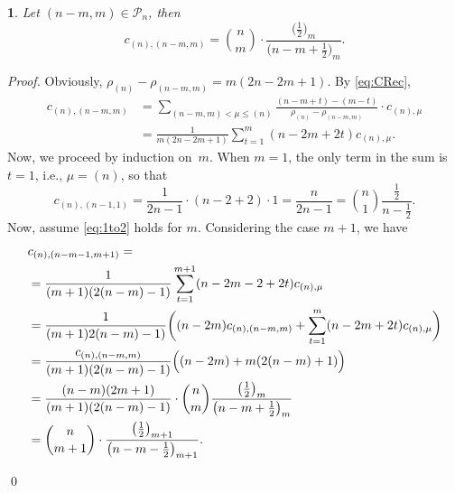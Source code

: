 \documentclass[smallextended]{svjour3}
\newtheorem{thm}{\protect\theoremname}
\providecommand{\theoremname}{Theorem}
\begin{document}
\begin{thm}\label{thm:row1}
Let $(n-m,m)\in\mathcal{P}_n$, then
\begin{equation}\label{eq:1to2}
  c_{(n),(n-m,m)} =
  \binom{n}{m}\cdot\frac{\bigl(\frac12\bigr)_m}{\bigl(n-m+\frac12\bigr)_m}.
\end{equation}
\end{thm}
\begin{proof}
Obviously, 
$ \rho_{(n)}-\rho_{(n-m,m)}=m(2n-2m+1)$. By \eqref{eq:CRec},
\begin{align*}
  c_{(n),(n-m,m)}
  &= \sum_{(n-m,m)<\mu\leq(n)}\frac{(n-m+t)-(m-t)}
    {\rho_{(n)}-\rho_{(n-m,m)}}\cdot c_{(n),\mu} \\
  &= \frac{1}{m(2n-2m+1)}\sum_{t=1}^{m}(n-2m+2t)c_{(n),\mu}.
\end{align*}
Now, we proceed by induction on~$m$. When $m=1$, the only term in the sum is $t=1$, i.e., $\mu=(n)$,  so that
\begin{equation}\label{eq:cnton1}
  c_{(n),(n-1,1)}=\frac{1}{2n-1}\cdot(n-2+2)\cdot1=\frac{n}{2n-1}=\binom{n}{1}\frac{\frac{1}{2}}{n-\frac{1}{2}}.
\end{equation}
Now, assume \eqref{eq:1to2} holds for $m$. Considering the case $m+1$, we have
\begin{align*}
  & c_{(n),(n-m-1,m+1)} = \\
  &= \frac{1}{(m+1)(2(n-m)-1)}\sum_{t=1}^{m+1}(n-2m-2+2t)c_{(n),\mu} \\
  &= \frac{1}{(m+1)2(n-m)-1)}\biggl((n-2m)c_{(n),(n-m,m)}+\sum_{t=1}^{m}(n-2m+2t)c_{(n),\mu}\biggr) \\
  &= \frac{c_{(n),(n-m,m)}}{(m+1)(2(n-m)-1)}\Bigl((n-2m)+m(2(n-m)+1)\Bigr) \\
  &= \frac{(n-m)(2m+1)}{(m+1)(2(n-m)-1)}\cdot\binom{n}{m}\frac{\bigl(\frac12\bigr)_m}{\bigl(n-m+\frac12\bigr)_m} \\
  &= \binom{n}{m+1}\cdot\frac{\bigl(\frac12\bigr)_{m+1}}{\bigl(n-m-\frac12\bigr)_{m+1}}.
\end{align*}
\vspace{-40pt}

\null\qed
\end{proof}
\end{document}

